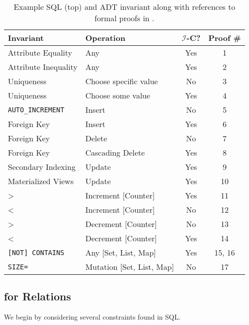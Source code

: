 \begin{table}
\begin{center}
\small
\begin{tabular}{|l|l|c|c|}
\hline
\textbf{Invariant} & \textbf{Operation} & $\mathcal{I}$-C? & Proof \#\\\hline

\rowcolor{yesgray}
Attribute Equality & Any & Yes &1\\
\rowcolor{yesgray}
Attribute Inequality & Any & Yes&2 \\
Uniqueness & Choose specific value & No&3\\
\rowcolor{yesgray}
Uniqueness & Choose some value & Yes&4\\
\texttt{AUTO\_INCREMENT} & Insert & No&5\\
\rowcolor{yesgray}
Foreign Key & Insert & Yes&6\\
Foreign Key & Delete & No&7\\
\rowcolor{yesgray}
Foreign Key & Cascading Delete & Yes&8\\
\rowcolor{yesgray}
Secondary Indexing & Update & Yes &9\\
\rowcolor{yesgray}
Materialized Views & Update & Yes &10\\\hline\hline
\rowcolor{yesgray}
> & Increment [Counter] & Yes &11 \\
< & Increment [Counter] & No &12\\
> & Decrement [Counter] & No &13\\
\rowcolor{yesgray}
< & Decrement [Counter] & Yes &14\\
\rowcolor{yesgray}
\texttt{[NOT] CONTAINS} & Any [Set, List, Map] & Yes &15, 16\\ 
\texttt{SIZE=} & Mutation [Set, List, Map] & No &17\\ \hline
\end{tabular}
\end{center}
\caption{Example SQL (top) and ADT invariant \iconfluence along with
  references to formal proofs in \rappendix{\appapply}.}
\label{table:invariants}
\end{table}

\subsection{\iconfluence for Relations}

We begin by considering several constraints found in SQL.

